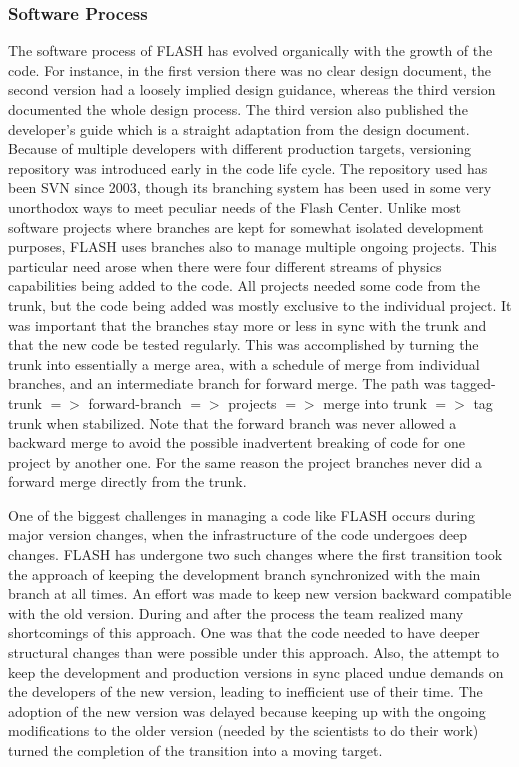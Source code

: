 \subsubsection{Software Process}
\label{sec:FLASHSoftwareProcess} 
The software process of FLASH has evolved organically with the growth
of the code. For instance, in the first version there was no clear
design document, the second version had a loosely implied design
guidance, whereas the third version documented the whole design
process. The third version also published the developer's guide which
is a straight adaptation from the design document. Because of multiple
developers with different production targets, versioning repository was
introduced early in the code life cycle. The repository used has been
SVN since 2003, though its branching system has been used in some very
unorthodox ways to meet peculiar needs of the Flash Center. Unlike
most software projects where branches are kept for somewhat isolated
development purposes, FLASH uses branches also to manage multiple
ongoing projects. This particular need arose when there were four
different streams of physics capabilities being added to the code. All
projects needed some code from the trunk, but the code being added was
mostly exclusive to the individual project. It was important that the
branches stay more or less in sync with the trunk and that the new
code be tested regularly. This was accomplished by turning the trunk
into essentially a merge area, with a schedule of merge from 
individual branches, and an intermediate branch for forward merge. The
path was tagged-trunk $=>$ forward-branch $=>$ projects $=>$ merge into
trunk $=>$ tag trunk when stabilized. Note that the forward branch was
never allowed a backward merge to avoid the possible inadvertent
breaking of code for one project by another one. For the same reason
the project branches never did a forward merge directly from the
trunk. 

One of the biggest challenges in managing a code like FLASH occurs
during major version changes, when the infrastructure of the code
undergoes deep changes. FLASH has undergone two such changes where the
first transition took the approach of keeping the development branch
synchronized with the main branch at all times. An effort was made to
keep new version backward compatible with the old version. During
and after the process the team realized many shortcomings of this
approach. One was that the code needed to have deeper structural
changes than were possible under this approach. Also, the attempt to keep the development and
production versions in sync placed undue demands on the developers of
the new version, leading to inefficient use of their time. The adoption of the new version was delayed
because keeping up with the ongoing modifications to the older version
(needed by the scientists to do their work) turned the completion of
the transition into a moving target. 

